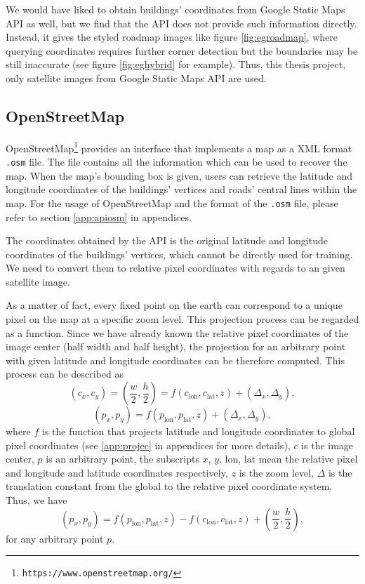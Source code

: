 

We would have liked to obtain buildings' coordinates from Google Static Maps API as well, but we find that the API does not provide such information directly. Instead, it gives the styled roadmap images like figure \ref{fig:egroadmap}, where querying coordinates requires further corner detection but the boundaries may be still inaccurate (see figure \ref{fig:eghybrid} for example). Thus, this thesis project, only satellite images from Google Static Maps API are used.

\subsection{OpenStreetMap}\label{apiosm}
OpenStreetMap\footnote{\lstinline{https://www.openstreetmap.org/}} provides an interface that implements a map as a XML format \lstinline{.osm} file. The file contains all the information which can be used to recover the map. When the map's bounding box is given, users can retrieve the latitude and longitude coordinates of the buildings' vertices and roads' central lines within the map. For the usage of OpenStreetMap and the format of the \lstinline{.osm} file, please refer to section \ref{app:apiosm} in appendices.

The coordinates obtained by the API is the original latitude and longitude coordinates of the buildings' vertices, which cannot be directly used for training. We need to convert them to relative pixel coordinates with regards to an given satellite image.

As a matter of fact, every fixed point on the earth can correspond to a unique pixel on the map at a specific zoom level. This projection process can be regarded as a function. Since we have already known the relative pixel coordinates of the image center (half width and half height), the projection for an arbitrary point with given latitude and longitude coordinates can be therefore computed. This process can be described as
\begin{equation}
	(c_x, c_y) = (\frac{w}{2}, \frac{h}{2}) = f(c_{\text{lon}}, c_{\text{lat}}, z) + (\Delta_x, \Delta_y),
\end{equation}
\begin{equation}
	(p_x, p_y) = f(p_{\text{lon}}, p_{\text{lat}}, z) + (\Delta_x, \Delta_y),
\end{equation}
where $f$ is the function that projects latitude and longitude coordinates to global pixel coordinates (see \ref{app:projec} in appendices for more details), $c$ is the image center, $p$ is an arbitrary point, the subscripts $x$, $y$, $\text{lon}$, $\text{lat}$ mean the relative pixel and longitude and latitude coordinates respectively, $z$ is the zoom level, $\Delta$ is the translation constant from the global to the relative pixel coordinate system. Thus, we have
\begin{equation}
	(p_x, p_y) = f(p_{\text{lon}}, p_{\text{lat}}, z) - f(c_{\text{lon}}, c_{\text{lat}}, z) + (\frac{w}{2}, \frac{h}{2}),
\end{equation}
for any arbitrary point $p$.

